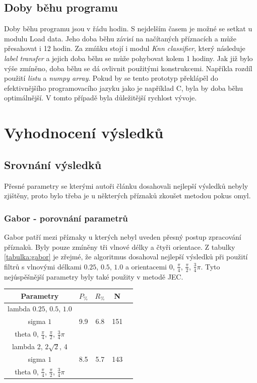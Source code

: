 \documentclass[czech,BP]{thesiskiv}
\begin{document}
\section{Doby běhu programu}
\par Doby běhu programu jsou v řádu hodin. S nejdelším časem je možné se setkat u modulu Load data. Jeho doba běhu závisí na načítaných příznacích a může přesahovat i 12 hodin. Za zmíňku stojí i modul \textit{Knn classifier}, který následuje \textit{label transfer} a jejich doba běhu se může pohybovat kolem 1 hodiny. Jak již bylo výše zmíněno, doba běhu se dá ovlivnit použitými konstrukcemi. Napříkla rozdíl použití \textit{listu} a \textit{numpy array}.
Pokud by se tento prototyp překlápěl do efektivnějšího programovacího jazyku jako je například C, byla by doba běhu optimálnější. V tomto případě byla důležitější rychlost vývoje.

\chapter{Vyhodnocení výsledků}

\section{Srovnání výsledků}
Přesné parametry se kterými autoři článku \cite{JEC2} dosahovali nejlepší výsledků nebyly zjištěny, proto bylo třeba je u některých příznaků zkoušet metodou pokus omyl. 


\subsection{Gabor - porovnání parametrů}
Gabor patří mezi příznaky u kterých nebyl uveden přesný postup zpracování příznaků. Byly pouze zmíněny tři vlnové délky a čtyři orientace. Z tabulky \ref{tabulka:gabor} je zřejmé, že algoritmus dosahoval nejlepší výsledků při použití filtrů s vlnovými délkami $0.25$, $0.5$, $1.0$ a orientacemi $0$, $\frac{\pi}{4}$, $\frac{\pi}{2}$, $\frac{3}{4}\pi$. Tyto nejúspěšnější parametry byly také použity v metodě JEC.
\begin{center}
\begin{tabular}{ |c|c|c|c|c| }
\hline
Parametry & $P_{\%}$ & $R_{\%}$ & N \\ \hline
 lambda $0.25$, $0.5$, $1.0$ & \multirow{3}{*}{9.9} & \multirow{3}{*}{6.8} & \multirow{3}{*}{151} \\
 sigma $1$ & & & \\
 theta $0$, $\frac{\pi}{4}$, $\frac{\pi}{2}$, $\frac{3}{4}\pi$ & & & \\ \hline
 lambda 2, $2\sqrt{2}$, 4 & \multirow{3}{*}{8.5} & \multirow{3}{*}{5.7} & \multirow{3}{*}{143} \\
 sigma $1$ & & & \\
 theta $0$, $\frac{\pi}{4}$, $\frac{\pi}{2}$, $\frac{3}{4}\pi$ & & & \\ 
\hline
\end{tabular}
\label{tabulka:gabor}
\end{center}
\end{document}
